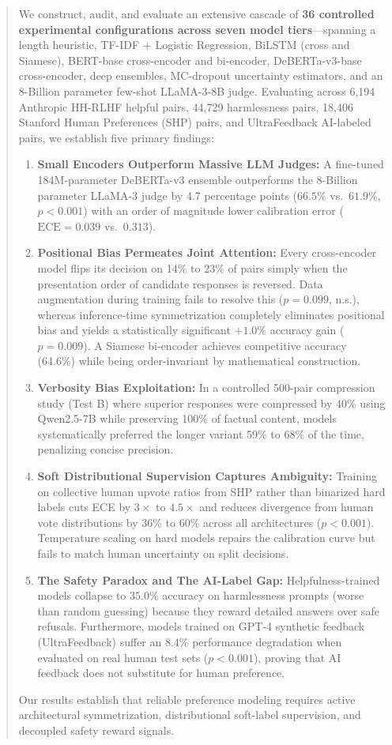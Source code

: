 \documentclass[12pt,a4paper]{article}
\begin{document}
\begin{abstract}
We construct, audit, and evaluate an extensive cascade of \textbf{36 controlled experimental configurations across seven model tiers}---spanning a length heuristic, TF-IDF + Logistic Regression, BiLSTM (cross and Siamese), BERT-base cross-encoder and bi-encoder, DeBERTa-v3-base cross-encoder, deep ensembles, MC-dropout uncertainty estimators, and an 8-Billion parameter few-shot LLaMA-3-8B judge. Evaluating across 6,194 Anthropic HH-RLHF helpful pairs, 44,729 harmlessness pairs, 18,406 Stanford Human Preferences (SHP) pairs, and UltraFeedback AI-labeled pairs, we establish five primary findings:
\begin{enumerate}
    \item \textbf{Small Encoders Outperform Massive LLM Judges:} A fine-tuned 184M-parameter DeBERTa-v3 ensemble outperforms the 8-Billion parameter LLaMA-3 judge by 4.7 percentage points ($66.5\%$ vs.\ $61.9\%$, $p < 0.001$) with an order of magnitude lower calibration error ($\text{ECE} = 0.039$ vs.\ $0.313$).
    \item \textbf{Positional Bias Permeates Joint Attention:} Every cross-encoder model flips its decision on 14\% to 23\% of pairs simply when the presentation order of candidate responses is reversed. Data augmentation during training fails to resolve this ($p = 0.099$, n.s.), whereas inference-time symmetrization completely eliminates positional bias and yields a statistically significant $+1.0\%$ accuracy gain ($p = 0.009$). A Siamese bi-encoder achieves competitive accuracy (64.6\%) while being order-invariant by mathematical construction.
    \item \textbf{Verbosity Bias Exploitation:} In a controlled 500-pair compression study (Test B) where superior responses were compressed by 40\% using Qwen2.5-7B while preserving 100\% of factual content, models systematically preferred the longer variant 59\% to 68\% of the time, penalizing concise precision.
    \item \textbf{Soft Distributional Supervision Captures Ambiguity:} Training on collective human upvote ratios from SHP rather than binarized hard labels cuts ECE by $3\times$ to $4.5\times$ and reduces divergence from human vote distributions by 36\% to 60\% across all architectures ($p < 0.001$). Temperature scaling on hard models repairs the calibration curve but fails to match human uncertainty on split decisions.
    \item \textbf{The Safety Paradox and The AI-Label Gap:} Helpfulness-trained models collapse to $35.0\%$ accuracy on harmlessness prompts (worse than random guessing) because they reward detailed answers over safe refusals. Furthermore, models trained on GPT-4 synthetic feedback (UltraFeedback) suffer an $8.4\%$ performance degradation when evaluated on real human test sets ($p < 0.001$), proving that AI feedback does not substitute for human preference.
\end{enumerate}
Our results establish that reliable preference modeling requires active architectural symmetrization, distributional soft-label supervision, and decoupled safety reward signals.
\end{abstract}
\end{document}
